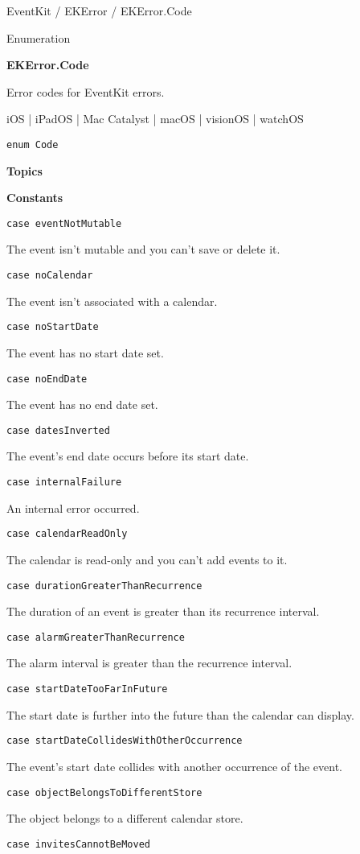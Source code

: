 \documentclass{article}
\title{}
\author{}
\date{}
\begin{document}
EventKit / EKError / EKError.Code

Enumeration

\textbf{EKError.Code}

Error codes for EventKit errors.

iOS | iPadOS | Mac Catalyst | macOS | visionOS | watchOS

\texttt{enum Code}

\textbf{Topics}

\textbf{Constants}

\texttt{case eventNotMutable}

The event isn't mutable and you can't save or delete it.

\texttt{case noCalendar}

The event isn't associated with a calendar.

\texttt{case noStartDate}

The event has no start date set.

\texttt{case noEndDate}

The event has no end date set.

\texttt{case datesInverted}

The event's end date occurs before its start date.

\texttt{case internalFailure}

An internal error occurred.

\texttt{case calendarReadOnly}

The calendar is read-only and you can't add events to it.

\texttt{case durationGreaterThanRecurrence}

The duration of an event is greater than its recurrence interval.

\texttt{case alarmGreaterThanRecurrence}

The alarm interval is greater than the recurrence interval.

\texttt{case startDateTooFarInFuture}

The start date is further into the future than the calendar can display.

\texttt{case startDateCollidesWithOtherOccurrence}

The event's start date collides with another occurrence of the event.

\texttt{case objectBelongsToDifferentStore}

The object belongs to a different calendar store.

\texttt{case invitesCannotBeMoved}
\end{document}
